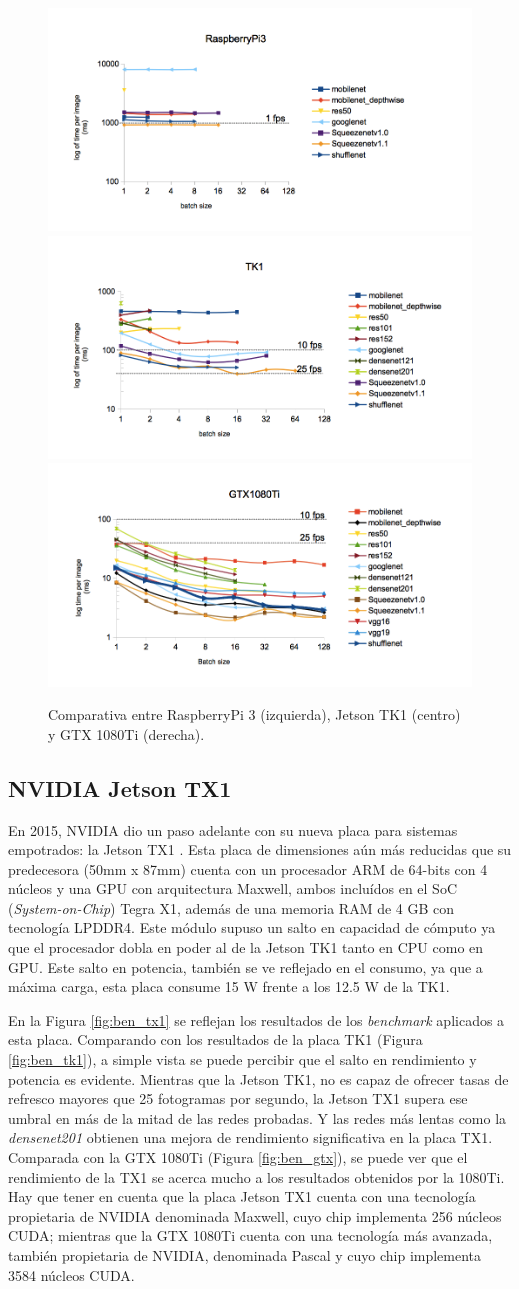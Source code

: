 \begin{figure}[htp]
    \centering
    \captionsetup{justification=centering}
    \includegraphics[width=.33\textwidth]{img/Raspi_log.png}\hfill
    \includegraphics[width=.33\textwidth]{img/TK1_log.png}\hfill
    \includegraphics[width=.33\textwidth]{img/gtx1080_log.png}
    \caption{Comparativa entre RaspberryPi 3 (izquierda), Jetson TK1 (centro) y GTX 1080Ti (derecha).}
    \label{fig:ben_tk1_comp}
\end{figure}

\subsection{NVIDIA Jetson TX1}

En 2015, NVIDIA dio un paso adelante con su nueva placa para sistemas empotrados: la Jetson TX1 \cite{jetsontx1}. Esta placa de dimensiones aún más reducidas que su predecesora (50mm x 87mm) cuenta con un procesador ARM de 64-bits con 4 núcleos y una GPU con arquitectura Maxwell, ambos incluídos en el SoC (\textit{System-on-Chip}) Tegra X1, además de una memoria RAM de 4 GB con tecnología LPDDR4. Este módulo supuso un salto en capacidad de cómputo ya que el procesador dobla en poder al de la Jetson TK1 tanto en CPU como en GPU. Este salto en potencia, también se ve reflejado en el consumo, ya que a máxima carga, esta placa consume 15 W frente a los 12.5 W de la TK1.

En la Figura \ref{fig:ben_tx1} se reflejan los resultados de los \textit{benchmark} aplicados a esta placa. Comparando con los resultados de la placa TK1 (Figura \ref{fig:ben_tk1}), a simple vista se puede percibir que el salto en rendimiento y potencia es evidente. Mientras que la Jetson TK1, no es capaz de ofrecer tasas de refresco mayores que 25 fotogramas por segundo, la Jetson TX1 supera ese umbral en más de la mitad de las redes probadas. Y las redes más lentas como la \textit{densenet201} obtienen una mejora de rendimiento significativa en la placa TX1.
Comparada con la GTX 1080Ti (Figura \ref{fig:ben_gtx}), se puede ver que el rendimiento de la TX1 se acerca mucho a los resultados obtenidos por la 1080Ti. Hay que tener en cuenta que la placa Jetson TX1 cuenta con una tecnología propietaria de NVIDIA denominada Maxwell, cuyo chip implementa 256 núcleos CUDA; mientras que la GTX 1080Ti cuenta con una tecnología más avanzada, también propietaria de NVIDIA, denominada Pascal y cuyo chip implementa 3584 núcleos CUDA.


